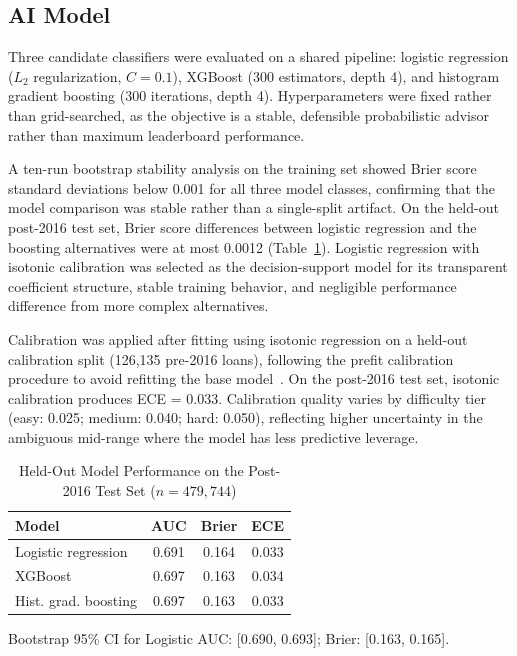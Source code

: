 \documentclass[conference]{IEEEtran}
\begin{document}
\subsection{AI Model}

Three candidate classifiers were evaluated on a shared pipeline: logistic
regression ($L_2$ regularization, $C = 0.1$), XGBoost (300 estimators,
depth 4), and histogram gradient boosting (300 iterations, depth 4).
Hyperparameters were fixed rather than grid-searched, as the objective is
a stable, defensible probabilistic advisor rather than maximum leaderboard
performance.

A ten-run bootstrap stability analysis on the training set showed Brier
score standard deviations below 0.001 for all three model classes,
confirming that the model comparison was stable rather than a
single-split artifact. On the held-out post-2016 test set, Brier score
differences between logistic regression and the boosting alternatives were
at most 0.0012 (Table~\ref{tab:model}). Logistic regression with isotonic
calibration was selected as the decision-support model for its transparent
coefficient structure, stable training behavior, and negligible
performance difference from more complex alternatives.

Calibration was applied after fitting using isotonic regression on a
held-out calibration split (126,135 pre-2016 loans), following the
prefit calibration procedure to avoid refitting the base
model~\cite{niculescu2005predicting}. On the post-2016 test set,
isotonic calibration produces ECE = 0.033. Calibration quality varies
by difficulty tier (easy: 0.025; medium: 0.040; hard: 0.050), reflecting
higher uncertainty in the ambiguous mid-range where the model has less
predictive leverage.

\begin{table}[H]
  \centering
  \caption{Held-Out Model Performance on the Post-2016 Test Set ($n = 479{,}744$)}
  \label{tab:model}
  \scriptsize
  \setlength{\tabcolsep}{3.5pt}
  \begin{tabular}{lccc}
    \toprule
    \textbf{Model} & \textbf{AUC} & \textbf{Brier} & \textbf{ECE} \\
    \midrule
    Logistic regression   & 0.691 & 0.164 & 0.033 \\
    XGBoost               & 0.697 & 0.163 & 0.034 \\
    Hist. grad. boosting  & 0.697 & 0.163 & 0.033 \\
    \bottomrule
  \end{tabular}

  \vspace{2pt}
  \parbox{\columnwidth}{\scriptsize
    Bootstrap 95\% CI for Logistic AUC: [0.690, 0.693];
    Brier: [0.163, 0.165].
  }
\end{table}
\end{document}

